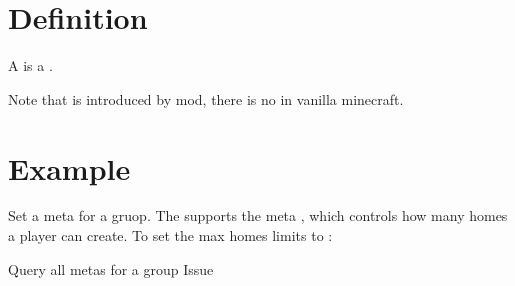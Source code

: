 \section{Definition}
A  is a .

\begin{note}{}
    Note that  is introduced by  mod, there is no  in vanilla minecraft.
\end{note}


\section{Example}{}
\begin{example}{Set a meta for a gruop.}
    The  supports the meta , which controls how many homes a player can create.
    To set the max homes limits to : 
\end{example}

\begin{example}{Query all metas for a group}
    Issue 
\end{example}